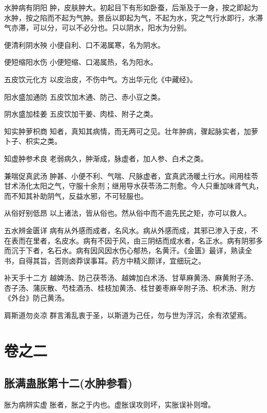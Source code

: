 \documentclass[a4paper,12pt,UTF8,twoside]{ctexbook}
\begin{document}
    水肿病有阴阳
    肿，皮肤肿大。初起目下有形如卧蚕，后渐及于一身，按之即起为水肿，按之陷而不起为气肿。景岳以即起为气，不起为水，究之气行水即行，水滞气亦滞，可以分，可以不必分也。只以阴水，阳水为分别。
    
    便清利阴水殃
    小便自利、口不渴属寒，名为阴水。
    
    便短缩阳水伤
    小便短缩、口渴属热，名为阳水。
    
    五皮饮元化方
    以皮治皮，不伤中气。方出华元化《中藏经》。
    
    阳水盛加通防
    五皮饮加木通、防己、赤小豆之类。
    
    阴水盛加桂姜
    五皮饮加干姜、肉桂、附子之类。
    
    知实肿萝枳商
    知者，真知其病情，而无两可之见。壮年肿病，骤起脉实者，加萝卜子、枳实之类。
    
    知虚肿参术良
    老弱病久，肿渐成，脉虚者，加人参、白术之类。
    
    兼喘促真武汤
    肿甚、小便不利、气喘、尺脉虚者，宜真武汤暖土行水。间用桂苓甘术汤化太阳之气，守服十余剂；继用导水茯苓汤二剂愈。今人只重加味肾气丸，而不知其补助阴气，反益水邪，不可轻服也。
    
    从俗好别低昂
    以上诸法，皆从俗也。然从俗中而不逾先民之矩，亦可以救人。
    
    五水辨金匮详
    病有从外感而成者，名风水。病从外感而成，其邪已渗入于皮，不在表而在里者，名皮水。病有不因于风，由三阴结而成水者，名正水。病有阴邪多而沉于下者，名石水。病有因风因水伤心郁热，名黄汗。《金匮》最详，熟读全书，自得其旨，否则卤莽误事耳。药方中精义颇详，宜细玩之。
    
    补天手十二方
    越婢汤、防己茯苓汤、越婢加白术汤、甘草麻黄汤、麻黄附子汤、杏子汤、蒲灰散、芍桂酒汤、桂枝加黄汤、桂甘姜枣麻辛附子汤、枳术汤、附方《外台》防己黄汤。
    
    肩斯道勿炎凉
    群言淆乱衷于圣，以斯道为己任，勿与世为浮沉，余有浓望焉。
    
    
    
    \part{卷之二}
    \chapter{胀满蛊胀第十二(水肿参看)} 

    胀为病辨实虚
    胀者，胀之于内也。虚胀误攻则坏，实胀误补则增。
    
\end{document}
